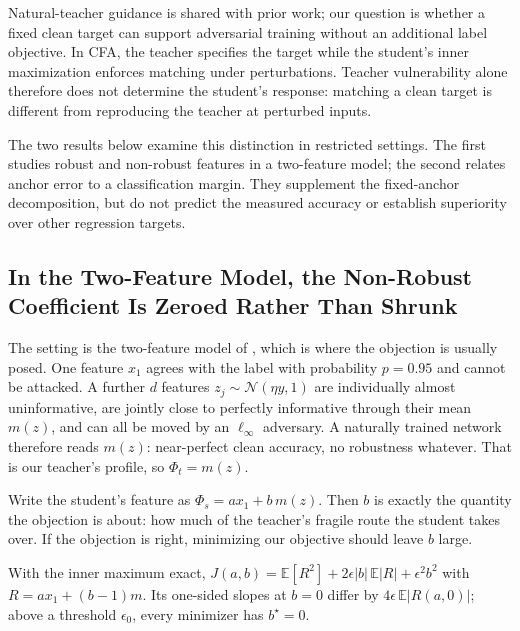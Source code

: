Natural-teacher guidance is shared with prior work; our question is whether a fixed clean target can
support adversarial training without an additional label objective. In CFA, the teacher specifies the
target while the student's inner maximization enforces matching under perturbations. Teacher
vulnerability alone therefore does not determine the student's response: matching a clean target
is different from reproducing the teacher at perturbed inputs.

The two results below examine this distinction in restricted settings. The first studies robust
and non-robust features in a two-feature model; the second relates anchor error to a classification
margin. They supplement the fixed-anchor decomposition, but do not predict the measured accuracy
or establish superiority over other regression targets.

\subsection{In the Two-Feature Model, the Non-Robust Coefficient Is Zeroed Rather Than Shrunk}

The setting is the two-feature model of \citet{tsipras2018robustness}, which is where the objection is
usually posed. One feature $x_1$ agrees with the label with probability $p = 0.95$ and cannot be
attacked. A further $d$ features $z_j \sim \mathcal{N}(\eta y, 1)$ are individually almost
uninformative, are jointly close to perfectly informative through their mean $m(z)$, and can all be
moved by an $\ell_\infty$ adversary. A naturally trained network therefore reads $m(z)$: near-perfect
clean accuracy, no robustness whatever. That is our teacher's profile, so $\Phi_t = m(z)$.

Write the student's feature as $\Phi_s = a x_1 + b\, m(z)$. Then $b$ is exactly the quantity the
objection is about: how much of the teacher's fragile route the student takes over. If the objection
is right, minimizing our objective should leave $b$ large.

\begin{proposition}
\label{prop:l1}
With the inner maximum exact,
$J(a,b) = \mathbb{E}[R^2] + 2\epsilon\lvert b\rvert\,\mathbb{E}\lvert R\rvert + \epsilon^2 b^2$ with
$R = a x_1 + (b-1)m$. Its one-sided slopes at $b=0$ differ by
$4\epsilon\,\mathbb{E}\lvert R(a,0)\rvert$; above a threshold $\epsilon_0$, every minimizer has
$b^\star = 0$.
\end{proposition}

